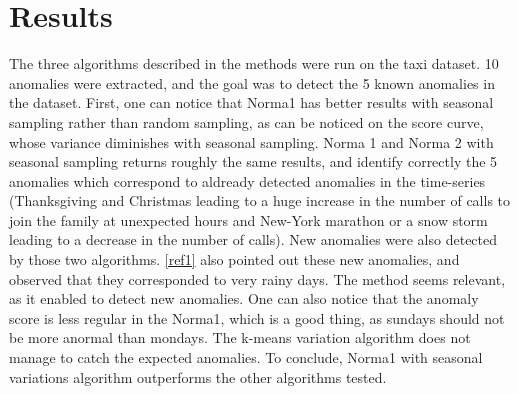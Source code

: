 \documentclass[11pt]{article}
\begin{document}

\section{Results}
The three algorithms described in the methods were run on the taxi dataset. 
10 anomalies were extracted, and the goal was to detect the 5 known anomalies in the dataset. 
First, one can notice that Norma1 has better results with seasonal sampling rather than random sampling, as can be noticed on the score curve, whose variance diminishes with seasonal sampling. 
Norma 1 and Norma 2 with seasonal sampling returns roughly the same results, and identify correctly the 5 anomalies which correspond to aldready detected anomalies in the time-series (Thanksgiving and Christmas leading to a huge increase in the number of calls to join the family at unexpected hours and New-York marathon or a snow storm leading to a decrease in the number of calls). 
New anomalies were also detected by those two algorithms.
\ref{ref1} also pointed out these new anomalies, and observed that they corresponded to very rainy days. 
The method seems relevant, as it enabled to detect new anomalies. 
One can also notice that the anomaly score is less regular in the Norma1, which is a good thing, as sundays should not be more anormal than mondays. 
The k-means variation algorithm does not manage to catch the expected anomalies. 
To conclude, Norma1 with seasonal variations algorithm outperforms the other algorithms tested. 
\end{document}
